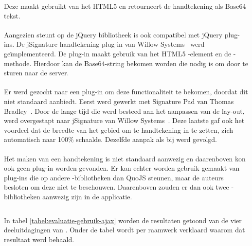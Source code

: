 Deze maakt gebruikt van het HTML5  en retourneert de handtekening als Base64 tekst.

\paragraph{\kendo}
Aangezien \kendo{} steunt op de jQuery bibliotheek is \kendo{} ook compatibel met jQuery plug-ins.
De jSignature handtekening plug-in van Willow Systems~\cite{Systems2013} werd geïmplementeerd.
De plug-in maakt gebruik van het HTML5 -element en de -methode.
Hierdoor kan de Base64-string bekomen worden die nodig is om door te sturen naar de server.

\paragraph{\jqm}
Er werd gezocht naar een plug-in om deze functionaliteit te bekomen, doordat \jqm{} dit niet standaard aanbiedt. 
Eerst werd gewerkt met Signature Pad van Thomas Bradley~\cite{Bradley2013}. 
Door de lange tijd die werd besteed aan het aanpassen van de lay-out, werd overgestapt naar jSignature van Willow Systems~\cite{Systems2013}. 
Deze laatste gaf ook het voordeel dat de breedte van het gebied om te handtekening in te zetten, zich automatisch naar 100\% schaalde. 
Dezelfde aanpak als bij \kendo{} werd gevolgd.

\paragraph{\lungo}
Het maken van een handtekening is niet standaard aanwezig en daarenboven kon ook geen plug-in worden gevonden.
Er kan echter worden gebruik gemaakt van plug-ins die op andere \js{}-bibliotheken dan QuoJS steunen, maar de auteurs besloten om deze niet te beschouwen.
Daarenboven zouden er dan ook twee \js{}-bibliotheken aanwezig zijn in de applicatie.



\subsection{}
\label{sec:evaluatie-gebruik-ajax}

In tabel \ref{tabel:evaluatie-gebruik-ajax} worden de resultaten getoond van de vier deeluitdagingen van .
Onder de tabel wordt per raamwerk verklaard waarom dat resultaat werd behaald.

